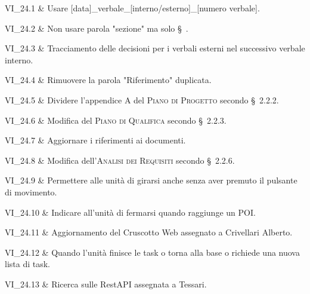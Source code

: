 VI\_24.1 & Usare [data]\_verbale\_[interno/esterno]\_[numero verbale].

\tabularnewline
VI\_24.2 & Non usare parola "sezione" ma solo \S\ .

\tabularnewline
VI\_24.3 & Tracciamento delle decisioni per i verbali esterni nel successivo verbale interno.

\tabularnewline
VI\_24.4 & Rimuovere la parola "Riferimento" duplicata.

\tabularnewline
VI\_24.5 & Dividere l'appendice A del \textsc{Piano di Progetto} secondo \S\ 2.2.2.

\tabularnewline
VI\_24.6 & Modifica del \textsc{Piano di Qualifica} secondo \S\ 2.2.3.

\tabularnewline
VI\_24.7 & Aggiornare i riferimenti ai documenti.

\tabularnewline
VI\_24.8 & Modifica dell'\textsc{Analisi dei Requisiti} secondo \S\ 2.2.6.

\tabularnewline
VI\_24.9 & Permettere alle unità di girarsi anche senza aver premuto il pulsante di movimento.

\tabularnewline
VI\_24.10 & Indicare all'unità di fermarsi quando raggiunge un POI.

\tabularnewline
VI\_24.11 & Aggiornamento del Cruscotto Web assegnato a Crivellari Alberto.

\tabularnewline
VI\_24.12 & Quando l'unità finisce le task o torna alla base o richiede una nuova lista di task.

\tabularnewline
VI\_24.13 & Ricerca sulle RestAPI assegnata a Tessari.